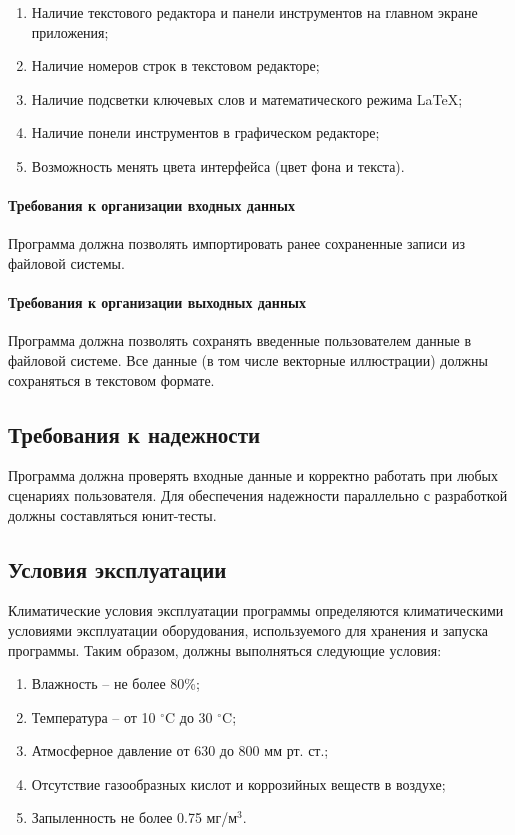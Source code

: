 \documentclass[techtask]{espd}
\begin{document}
\begin{enumerate}
\item Наличие текстового редактора и панели инструментов на главном экране приложения;
\item Наличие номеров строк в текстовом редакторе;
\item Наличие подсветки ключевых слов и математического режима LaTeX;
\item Наличие понели инструментов в графическом редакторе;
\item Возможность менять цвета интерфейса (цвет фона и текста).
\end{enumerate}

\paragraph{Требования к организации входных данных}
Программа должна позволять импортировать ранее сохраненные записи из файловой системы.

\paragraph{Требования к организации выходных данных}
Программа должна позволять сохранять введенные пользователем данные в файловой системе. Все данные (в том числе векторные иллюстрации) должны сохраняться в текстовом формате.

\subsection{Требования к надежности}
Программа должна проверять входные данные и корректно работать при любых сценариях пользователя. Для обеспечения надежности параллельно с разработкой должны составляться юнит-тесты.

\subsection{Условия эксплуатации}
Климатические условия эксплуатации программы определяются климатическими условиями эксплуатации оборудования, используемого для хранения и запуска программы. Таким образом, должны выполняться следующие условия:

\begin{enumerate}
\item Влажность -- не более 80\%;
\item Температура -- от 10 $^\circ$C до 30 $^\circ$C;
\item Атмосферное давление от 630 до 800 мм рт. ст.;
\item Отсутствие газообразных кислот и коррозийных веществ в воздухе;
\item Запыленность не более 0.75 мг/м$^3$.
\end{enumerate}
\end{document}
